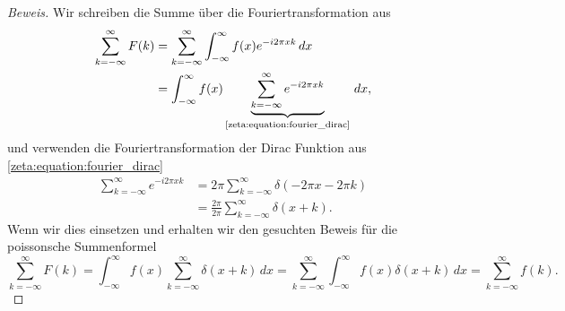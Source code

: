 \begin{proof}[Beweis]
    Wir schreiben die Summe über die Fouriertransformation aus
    \begin{align}
        \sum_{k=-\infty}^{\infty}
        F(k)
        &=
        \sum_{k=-\infty}^{\infty}
        \int_{-\infty}^{\infty}
        f(x)
        e^{-i 2\pi x k}
        \, dx
        \\
        &=
        \int_{-\infty}^{\infty}
        f(x)
        \underbrace{
        \sum_{k=-\infty}^{\infty}
        e^{-i 2\pi x k}
        }_{\text{\eqref{zeta:equation:fourier_dirac}}}
        \, dx,
    \end{align}
    und verwenden die Fouriertransformation der Dirac Funktion aus \eqref{zeta:equation:fourier_dirac}
    \begin{align}
        \sum_{k=-\infty}^{\infty}
        e^{-i 2\pi x k}
        &=
        2 \pi
        \sum_{k=-\infty}^{\infty}
        \delta(-2\pi x - 2\pi k)
        \\
        &=
        \frac{2 \pi}{2 \pi}
        \sum_{k=-\infty}^{\infty}
        \delta(x + k).
    \end{align}
    Wenn wir dies einsetzen und erhalten wir den gesuchten Beweis für die poissonsche Summenformel
    \begin{equation}
        \sum_{k=-\infty}^{\infty}
        F(k)
        =
        \int_{-\infty}^{\infty}
        f(x)
        \sum_{k=-\infty}^{\infty}
        \delta(x + k)
        \, dx
        =
        \sum_{k=-\infty}^{\infty}
        \int_{-\infty}^{\infty}
        f(x)
        \delta(x + k)
        \, dx
        =
        \sum_{k=-\infty}^{\infty}
        f(k).
    \end{equation}
\end{proof}
